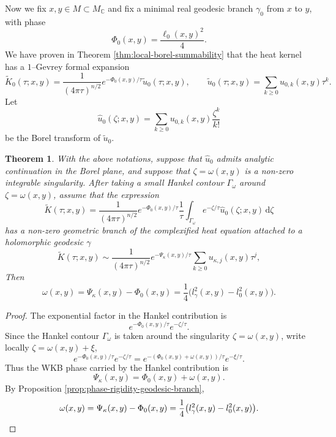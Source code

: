 \documentclass[11pt]{amsart}
\theoremstyle{plain}
\newtheorem{thm}{Theorem}[section]
\theoremstyle{definition}
\newcommand{\C}{\mathbb{C}}
\newcommand{\dd}{\mathrm d}
\begin{document}
Now we fix $x,y\in M\subset M_{\C}$ and fix a minimal real geodesic branch $\gamma_0$ from $x$ to $y$, with phase
\[
\Phi_0(x,y)=\frac{\ell_0(x,y)^2}{4}.
\]
We have proven in Theorem \ref{thm:local-borel-summability} that the heat kernel has a $1$--Gevrey formal expansion
\[
\widetilde K_0(\tau;x,y)
=\frac{1}{(4\pi\tau)^{n/2}}
e^{-\Phi_0(x,y)/\tau}\widetilde{u}_0(\tau;x,y),\qquad \widetilde{u}_0(\tau;x,y)=
\sum_{k\geq 0}u_{0,k}(x,y)\tau^k.
\]
Let
\[
\widehat u_0(\zeta;x,y)
=\sum_{k\geq 0}u_{0,k}(x,y)\frac{\zeta^k}{k!}
\]
be the Borel transform of $\widetilde{u}_0$. 




\begin{thm}\label{thm:Borel-singularity-complex-geodesic}
With the above notations, suppose that $\widehat u_0$ admits analytic continuation in the Borel
plane, and suppose that $\zeta=\omega(x,y)$ is a non-zero {integrable} singularity.
After taking a small Hankel contour
$\Gamma_\omega$ around $\zeta=\omega(x,y)$, assume that the expression
\[
\widetilde K(\tau;x,y)
=
\frac{1}{(4\pi \tau)^{n/2}}
e^{-\Phi_0(x,y)/\tau}
\frac{1}{\tau}
\int_{\Gamma_\omega}
e^{-\zeta/\tau}
\widehat u_0(\zeta;x,y)\,\dd\zeta
\]
has a non-zero geometric branch of the complexified heat equation attached to a holomorphic geodesic $\gamma$
\[
\widetilde K(\tau;x,y)
\sim
\frac{1}{(4\pi\tau)^{n/2}}
e^{-\Psi_\kappa(x,y)/\tau}
\sum_{k\geq0}u_{\kappa,j}(x,y)\tau^j,
\]
Then
\[
\omega(x,y)=\Psi_\kappa(x,y)-\Phi_0(x,y)=\frac{1}{4}\bigl(l_{\gamma}^2(x,y)-l_0^2(x,y)\bigr).
\]
\end{thm}



\begin{proof}
The exponential factor in the Hankel contribution is
\[
e^{-\Phi_0(x,y)/\tau}e^{-\zeta/\tau}.
\]
Since the Hankel contour $\Gamma_\omega$ is taken around the singularity
$\zeta=\omega(x,y)$, write locally $\zeta=\omega(x,y)+\xi$, 
\[
e^{-\Phi_0(x,y)/\tau}e^{-\zeta/\tau}=e^{-(\Phi_0(x,y)+\omega(x,y))/\tau}e^{-\xi/\tau}.
\]
Thus the WKB phase carried by the Hankel contribution is
\[
\Psi_\kappa(x,y)=\Phi_0(x,y)+\omega(x,y).
\]
By Proposition \ref{prop:phase-rigidity-geodesic-branch},
\[
\omega(x,y)=\Psi_\kappa(x,y)-\Phi_0(x,y)=\frac{1}{4}\bigl(l_{\gamma}^2(x,y)-l_0^2(x,y)\bigr).\qedhere
\]
\end{proof}
\end{document}
